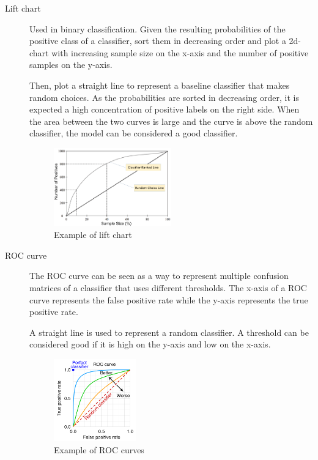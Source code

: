 \begin{description}
    \item[Lift chart] 
        Used in binary classification.
        Given the resulting probabilities of the positive class of a classifier, 
        sort them in decreasing order and plot a 2d-chart with
        increasing sample size on the x-axis and the number of positive samples on the y-axis.

        Then, plot a straight line to represent a baseline classifier that makes random choices.
        As the probabilities are sorted in decreasing order, it is expected a high concentration of
        positive labels on the right side.
        When the area between the two curves is large and the curve is above the random classifier, 
        the model can be considered a good classifier.

        \begin{figure}[H]
            \centering
            \includegraphics[width=0.5\textwidth]{img/lift_chart.png}
            \caption{Example of lift chart}
        \end{figure}

    \item[ROC curve] 
        The ROC curve can be seen as a way to represent multiple confusion matrices of a classifier
        that uses different thresholds.
        The x-axis of a ROC curve represents the false positive rate while the y-axis represents the true positive rate.

        A straight line is used to represent a random classifier.
        A threshold can be considered good if it is high on the y-axis and low on the x-axis.
        
        \begin{figure}[H]
            \centering
            \includegraphics[width=0.35\textwidth]{img/roc_curve.png}
            \caption{Example of ROC curves}
        \end{figure}
\end{description}


